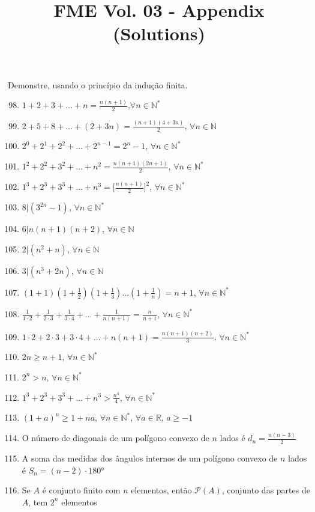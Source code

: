 \documentclass[12pt, openright, a4paper, twoside, english, brazil]{article}
\title{FME Vol. 03 - Appendix (Solutions)}
\author{}
\date{}
\newcommand{\forallN}{$\forall n\in \mathbb N$}
\newcommand{\forallNp}{$\forall n\in \mathbb N^*$}
\begin{document}
\maketitle

Demonstre, usando o princípio da indução finita.

\begin{enumerate}[\bfseries 1.]
    \setcounter{enumi}{97}
  \item $1+2+3+...+n=\frac{n(n+1)}{2}$,\forallNp
  \item $2+5+8+...+(2+3n)=\frac{(n+1)(4+3n)}{2}$, \forallN
  \item $2^0+2^1+2^2+...+2^{n-1}=2^n-1$, \forallNp
  \item $1^2+2^2+3^2+...+n^2=\frac{n(n+1)(2n+1)}{2}$, \forallNp
  \item $1^3+2^3+3^3+...+n^3=\lbrack \frac{n(n+1)}{2}\rbrack^2$, \forallNp
  \item $8|(3^{2n}-1)$, \forallNp
  \item $6|n(n+1)(n+2)$, \forallN
  \item $2|(n^2+n)$, \forallN
  \item $3|(n^3+2n)$, \forallN
  \item $(1+1)(1+\frac 1 2)(1+\frac 1 3)...(1+\frac 1 n)=n+1$, \forallNp
  \item $\frac{1}{1\cdot 2}+\frac{1}{2\cdot 3}+\frac{1}{3\cdot
    4}+...+\frac{1}{n(n+1)}=\frac{n}{n+1}$, \forallNp
  \item $1\cdot 2+2\cdot 3+3\cdot 4+...+n(n+1)=\frac{n(n+1)(n+2)}{3}$, \forallNp
  \item $2n\ge n+1$, \forallNp
  \item $2^n>n$, \forallNp
  \item $1^3+2^3+3^3+...+n^3>\frac{n^4}{4}$, \forallNp
  \item $(1+a)^n\ge1+na$, \forallNp, $\forall a\in \mathbb R$, $a\ge-1$
  \item O número de diagonais de um polígono convexo de $n$ lados é
    $d_n=\frac{n(n-3)}{2}$
  \item A soma das medidas dos ângulos internos de um polígono
    convexo de $n$ lados é $S_n=(n-2)\cdot 180$°
  \item Se $A$ é conjunto finito com $n$ elementos, então $\mathcal P(A)$,
    conjunto das partes de $A$, tem $2^n$ elementos
\end{enumerate}
\end{document}
